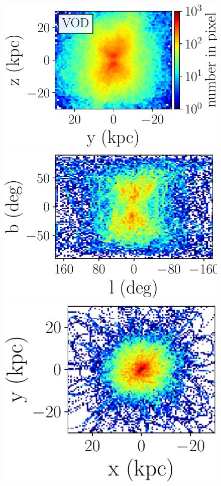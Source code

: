 \documentclass[fleqn,usenatbib]{mnras}
\begin{document}
\begin{figure}
             \includegraphics[scale=0.302]{VOD_orbits_8Gyrs_yz_defaultmass.pdf}\\ \includegraphics[scale=0.302]{VOD_orbits_8Gyrs_lb_1116.pdf}
             \includegraphics[scale=0.302]{VOD_orbits_8Gyrs_xy_1116.pdf}

\end{figure}
\end{document}
